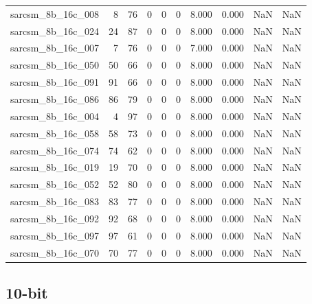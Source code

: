 \documentclass{article}
\begin{document}
\begin{longtable}{lrrrrrrrrr}
sarcsm\_8b\_16c\_008 & 8 & 76 & 0 & 0 & 0 & 8.000 & 0.000 & NaN & NaN \\
sarcsm\_8b\_16c\_024 & 24 & 87 & 0 & 0 & 0 & 8.000 & 0.000 & NaN & NaN \\
sarcsm\_8b\_16c\_007 & 7 & 76 & 0 & 0 & 0 & 7.000 & 0.000 & NaN & NaN \\
sarcsm\_8b\_16c\_050 & 50 & 66 & 0 & 0 & 0 & 8.000 & 0.000 & NaN & NaN \\
sarcsm\_8b\_16c\_091 & 91 & 66 & 0 & 0 & 0 & 8.000 & 0.000 & NaN & NaN \\
sarcsm\_8b\_16c\_086 & 86 & 79 & 0 & 0 & 0 & 8.000 & 0.000 & NaN & NaN \\
sarcsm\_8b\_16c\_004 & 4 & 97 & 0 & 0 & 0 & 8.000 & 0.000 & NaN & NaN \\
sarcsm\_8b\_16c\_058 & 58 & 73 & 0 & 0 & 0 & 8.000 & 0.000 & NaN & NaN \\
sarcsm\_8b\_16c\_074 & 74 & 62 & 0 & 0 & 0 & 8.000 & 0.000 & NaN & NaN \\
sarcsm\_8b\_16c\_019 & 19 & 70 & 0 & 0 & 0 & 8.000 & 0.000 & NaN & NaN \\
sarcsm\_8b\_16c\_052 & 52 & 80 & 0 & 0 & 0 & 8.000 & 0.000 & NaN & NaN \\
sarcsm\_8b\_16c\_083 & 83 & 77 & 0 & 0 & 0 & 8.000 & 0.000 & NaN & NaN \\
sarcsm\_8b\_16c\_092 & 92 & 68 & 0 & 0 & 0 & 8.000 & 0.000 & NaN & NaN \\
sarcsm\_8b\_16c\_097 & 97 & 61 & 0 & 0 & 0 & 8.000 & 0.000 & NaN & NaN \\
sarcsm\_8b\_16c\_070 & 70 & 77 & 0 & 0 & 0 & 8.000 & 0.000 & NaN & NaN \\
\end{longtable}

\subsection*{10-bit}
\end{document}
